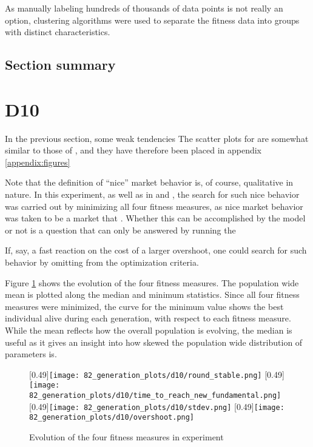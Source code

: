 As manually labeling hundreds of thousands of data points is not really an option, clustering algorithms were used to separate the fitness data into groups with distinct characteristics. 

\subsection{Section summary}


\section{D10}
In the previous section, some weak tendencies 
The scatter plots for \dten{} are somewhat similar to those of \dnine, and they have therefore been placed in appendix \ref{appendix:figures}





Note that the definition of ``nice'' market behavior is, of course, qualitative in nature. In this experiment, as well as in \dnine{} and \deleven, the search for such nice behavior was carried out by minimizing all four fitness measures, as nice market behavior was taken to be a market that . Whether this can be accomplished by the model or not is a question that can only be answered by running the 

If, say, a fast reaction on the cost of a larger overshoot, one could search for such behavior by omitting \overshoot{} from the optimization criteria.



Figure \ref{fig:d10_evolution_fitness} shows the evolution of the four fitness measures. The population wide mean is plotted along the median and minimum statistics. Since all four fitness measures were minimized, the curve for the minimum value shows the best individual alive during each generation, with respect to each fitness measure. While the mean reflects how the overall population is evolving,  the median is useful as it gives an insight into how skewed the population wide distribution of parameters is. 
\begin{figure}
	\centering
	[0.49\linewidth]{\texttt{[image: 82\_generation\_plots/d10/round\_stable.png]}}
	[0.49\linewidth]{\texttt{[image: 82\_generation\_plots/d10/time\_to\_reach\_new\_fundamental.png]}}
	[0.49\linewidth]{\texttt{[image: 82\_generation\_plots/d10/stdev.png]}}
	[0.49\linewidth]{\texttt{[image: 82\_generation\_plots/d10/overshoot.png]}}
	\caption{Evolution of the four fitness measures in experiment \dten}
	\label{fig:d10_evolution_fitness}
\end{figure}



